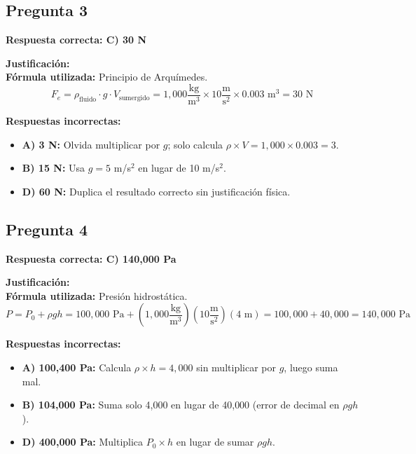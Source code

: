 \begin{respuestabox}
\subsection*{Pregunta 3}
\textcolor{verdecorrecto}{\textbf{Respuesta correcta: C) 30 N}}

\textbf{Justificación:}\\
\textbf{Fórmula utilizada:} Principio de Arquímedes.
$$F_e = \rho_{\text{fluido}} \cdot g \cdot V_{\text{sumergido}} = 1{,}000 \frac{\text{kg}}{\text{m}^3} \times 10 \frac{\text{m}}{\text{s}^2} \times 0.003 \text{ m}^3 = 30 \text{ N}$$

\textbf{Respuestas incorrectas:}
\begin{itemize}
    \item \textbf{A) 3 N:} Olvida multiplicar por $g$; solo calcula $\rho \times V = 1{,}000 \times 0.003 = 3$.
    \item \textbf{B) 15 N:} Usa $g = 5$ m/s$^2$ en lugar de 10 m/s$^2$.
    \item \textbf{D) 60 N:} Duplica el resultado correcto sin justificación física.
\end{itemize}
\end{respuestabox}

\begin{respuestabox}
\subsection*{Pregunta 4}
\textcolor{verdecorrecto}{\textbf{Respuesta correcta: C) 140{,}000 Pa}}

\textbf{Justificación:}\\
\textbf{Fórmula utilizada:} Presión hidrostática.
$$P = P_0 + \rho g h = 100{,}000 \text{ Pa} + \left(1{,}000 \frac{\text{kg}}{\text{m}^3}\right)\left(10 \frac{\text{m}}{\text{s}^2}\right)(4 \text{ m}) = 100{,}000 + 40{,}000 = 140{,}000 \text{ Pa}$$

\textbf{Respuestas incorrectas:}
\begin{itemize}
    \item \textbf{A) 100{,}400 Pa:} Calcula $\rho \times h = 4{,}000$ sin multiplicar por $g$, luego suma mal.
    \item \textbf{B) 104{,}000 Pa:} Suma solo 4{,}000 en lugar de 40{,}000 (error de decimal en $\rho g h$).
    \item \textbf{D) 400{,}000 Pa:} Multiplica $P_0 \times h$ en lugar de sumar $\rho g h$.
\end{itemize}
\end{respuestabox}

